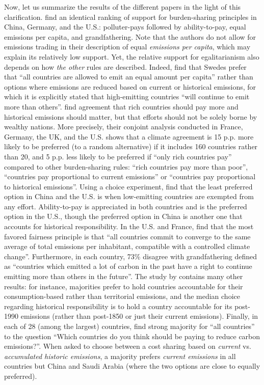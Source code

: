 \documentclass[12pt,english]{article}
\begin{document}
Now, let us summarize the results of the different papers in the light of this clarification. 
\citet{schleich_citizens_2016} find an identical ranking of support for burden-sharing principles in China, Germany, and the U.S.: polluter-pays followed by ability-to-pay, equal emissions per capita, and grandfathering. 
Note that the authors do not allow for emissions trading in their description of equal \textit{emissions per capita}, which may explain its relatively low support. 
Yet, the relative support for egalitarianism also depends on how \textit{the other} rules are described. Indeed, \citet{carlsson_is_2011} find that Swedes prefer that ``all countries are allowed to emit an equal amount per capita'' rather than options where emissions are reduced based on current or historical emissions, for which it is explicitly stated that high-emitting countries ``will continue to emit more than others''. 
\citet{bechtel_mass_2013} find agreement that rich countries should pay more and historical emissions should matter, but that efforts should not be solely borne by wealthy nations. More precisely, their conjoint analysis conducted in France, Germany, the UK, and the U.S. shows that a climate agreement is 15 p.p. more likely to be preferred  (to a random alternative) if it includes 160 countries rather than 20, and 5 p.p. less likely to be preferred if ``only rich countries pay'' compared to other burden-sharing rules: ``rich countries pay more than poor'', ``countries pay proportional to current emissions'' or ``countries pay proportional to historical emissions''. %
Using a choice experiment, \citet{carlsson_fair_2013} find that the least preferred option in China and the U.S. is when low-emitting countries are exempted from any effort. Ability-to-pay is appreciated in both countries and is the preferred option in the U.S., though the preferred option in China is another one that accounts for historical responsibility. %
In the U.S. and France, \citet{meilland_international_2023} find that the most favored fairness principle is that ``all countries commit to converge to the same average of total emissions per inhabitant, compatible with a controlled climate change''. Furthermore, in each country, 73\% disagree with grandfathering defined as ``countries which emitted a lot of carbon in the past have a right to continue emitting more than others in the future''. The study by \citet{meilland_international_2023} contains many other results: for instance, majorities prefer to hold countries accountable for their consumption-based rather than territorial emissions, and the median choice regarding historical responsibility is to hold a country accountable for its post-1990 emissions (rather than post-1850 or just their current emissions). 
Finally, in each of 28 (among the largest) countries, \citet{dabla-norris_public_2023} find strong majority for ``all countries'' to the question ``Which countries do you think should be paying to reduce carbon emissions?''. When asked to choose between a cost sharing based on \textit{current} vs. \textit{accumulated historic emissions}, a majority prefers \textit{current emissions} in all countries but China and Saudi Arabia (where the two options are close to equally preferred). %
\end{document}
